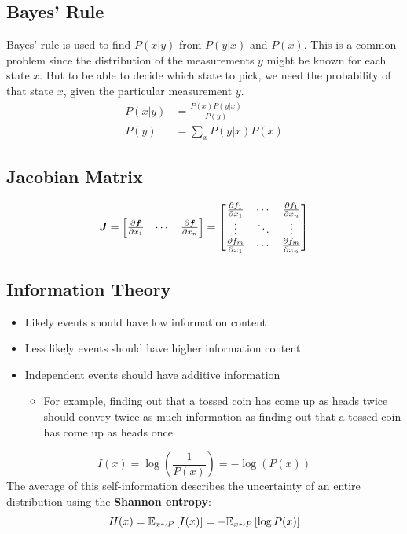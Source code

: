 \begin{multicols}{2}
	\subsection{Bayes' Rule}
	Bayes' rule is used to find $P(x|y)$ from $P(y|x)$ and $P(x)$. This is a common problem since the distribution of the measurements $y$ might be known for each state $x$. But to be able to decide which state to pick, we need the probability of that state $x$, given the particular measurement $y$.
	\begin{align*}
	P(x|y) &= \frac{P(x)P(y|x)}{P(y)}\\
	P(y)   &= \sum_x P(y|x)P(x)
	\end{align*}
	
	\subsection{Jacobian Matrix}
	\[ \bol{J} = 
	\begin{bmatrix} \frac{\partial \bol{f}}{\partial x_1} & \cdots & \frac{\partial \bol{f}}{\partial x_n} \end{bmatrix} = 
	\begin{bmatrix} 
	\frac{\partial f_1}{\partial x_1} & \cdots & \frac{\partial f_1}{\partial x_n}\\
	\vdots & \ddots & \vdots \\
	\frac{\partial f_m}{\partial x_1} & \cdots & \frac{\partial f_m}{\partial x_n}
	 \end{bmatrix}   \]
	
	\subsection{Information Theory}
	\begin{itemize}
		\item Likely events should have low information content
		\item Less likely events should have higher information content
		\item Independent events should have additive information
		\begin{itemize}
			\item For example, finding out that a tossed coin has come up as heads twice should convey twice as much information as finding out that a tossed coin has come up as heads once
		\end{itemize}
	\end{itemize}
	\[ I(x) = \log\left(\frac{1}{P(x)}\right) = -\log \left(P(x)\right) \]
	The average of this self-information describes the uncertainty of an entire distribution using the \textbf{Shannon entropy}:
	\[ H(x) = \mathbb{E}_{x\sim P}\left[I(x)\right] = -\mathbb{E}_{x\sim P}\left[\log P(x)\right] \]
	

\end{multicols}
